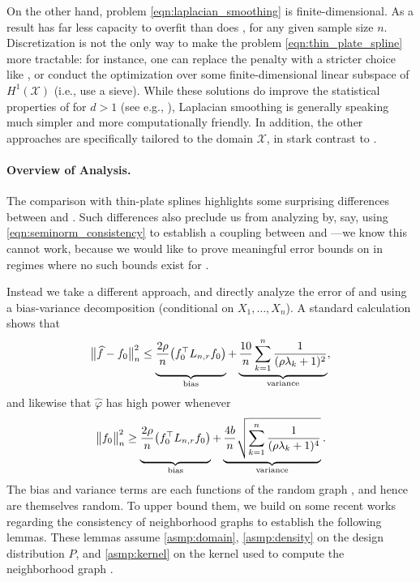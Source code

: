 \documentclass[twoside]{article}
\newcommand{\1}{\mathbf{1}}
\DeclareMathOperator*{\esssup}{ess\,sup}
\newcommand{\Lap}{L}
\newcommand{\Xset}{\mathcal{X}}
\newcommand{\wt}[1]{\widetilde{#1}}
\newcommand{\wh}[1]{\widehat{#1}}
\theoremstyle{definition}
\theoremstyle{remark}
\begin{document}
On the other hand, problem \eqref{eqn:laplacian_smoothing} is finite-dimensional. As a result \smash{$\wh{f}$} has far less capacity to overfit than does \smash{$\wt{f}$}, for any given sample size $n$. Discretization is not the only way to make the problem \eqref{eqn:thin_plate_spline} more tractable: for instance, one can replace the penalty \smash{$\int_{\Xset} \|\nabla f(x)\|_2^2 \,dx$} with a stricter choice like \smash{$\esssup_{x \in \Xset} \|\nabla f(x)\|_2$}, or conduct the optimization over some finite-dimensional linear subspace of $H^1(\Xset)$ (i.e., use a sieve). While these solutions do improve the statistical properties of \smash{$\wt{f}$} for $d > 1$ (see e.g., \citet{birge1993,birge1998,vandergeer2000}), Laplacian smoothing is generally speaking much simpler and more computationally friendly. In addition, the other approaches are specifically tailored to the domain $\Xset$, in stark contrast to \smash{$\wh{f}$}.

\paragraph{Overview of Analysis.}

The comparison with thin-plate splines highlights some surprising differences between \smash{$\wh{f}$} and \smash{$\wt{f}$}. Such differences also preclude us from analyzing \smash{$\wh{f}$} by, say, using \eqref{eqn:seminorm_consistency} to establish a coupling between \smash{$\wh{f}$} and \smash{$\wt{f}$}---we know this cannot work, because we would like to prove meaningful error bounds on \smash{$\wh{f}$} in regimes where no such bounds exist for \smash{$\wt{f}$}.

Instead we take a different approach, and directly analyze the error of \smash{$\wh{f}$} and \smash{$\wh{T}$} using a bias-variance decomposition (conditional on $X_1,\ldots,X_n$). A standard calculation shows that
\begin{equation*}
\bigl\|\wh{f} - f_0\bigr\|_n^2 \leq \underbrace{\vphantom{\sum_{k=1}^n}\frac{2\rho}{n} \bigl(f_0^\top \Lap_{n,r} f_0\bigr)}_{\textrm{bias}} + \underbrace{\frac{10}{n} \sum_{k = 1}^{n} \frac{1}{(\rho \lambda_k + 1)^2}}_{\textrm{variance}},
\end{equation*}
and likewise that $\wh{\varphi}$ has high power whenever
\begin{equation*}
\bigl\|f_0\bigr\|_n^2 \geq \underbrace{\vphantom{\sqrt{\sum_{k=1}^n}}\frac{2\rho}{n} \bigl(f_0^\top \Lap_{n,r} f_0\bigr)}_{\textrm{bias}} + \underbrace{\frac{4b}{n} \sqrt{\sum_{k = 1}^{n} \frac{1}{(\rho \lambda_k + 1)^4}}}_{\textrm{variance}}.
\end{equation*}
The bias and variance terms are each functions of the random graph , and hence are themselves random. To upper bound them, we build on some recent works \citep{burago2014,trillos2019,calder2019} regarding the consistency of neighborhood graphs to establish the following lemmas. These lemmas assume \ref{asmp:domain}, \ref{asmp:density} on the design distribution $P$, and \ref{asmp:kernel} on the kernel used to compute the neighborhood graph . 
\end{document}
